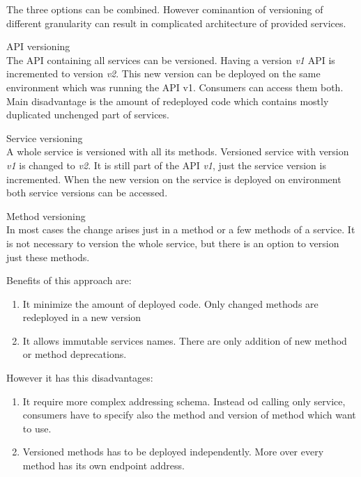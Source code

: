 The three options can be combined. However cominantion of versioning of different granularity can result in complicated architecture of provided services.

\begin{description}
\item{API versioning} \\
The API containing all services can be versioned. Having a version \emph{v1} API is incremented to version \emph{v2}. This new version can be deployed on the same environment which was running the API v1. Consumers can access them both. Main disadvantage is the amount of redeployed code which contains mostly duplicated unchenged part of services. 
\item{Service versioning} \\
  A whole service is versioned with all its methods. Versioned service with version \emph{v1} is changed to \emph{v2}. It is still part of the API \emph{v1}, just the service version is incremented. When the new version on the service is deployed on environment both service versions can be accessed. 
\item{Method versioning} \\
  In most cases the change arises just in a method or a few methods of a service. It is not necessary to version the whole service, but there is an option to version just these methods. 
  
  Benefits of this approach are:
  
  \begin{enumerate}
    \item It minimize the amount of deployed code. Only changed methods are redeployed in a new version
    \item It allows immutable services names. There are only addition of new method or method deprecations.
  \end{enumerate}
  
  However it has this disadvantages:
  
  \begin{enumerate}
    \item It require more complex addressing schema. Instead od calling only service, consumers have to specify also the method and version of method which want to use.
    \item Versioned methods has to be deployed independently. More over every method has its own endpoint address.
  \end{enumerate}
\end{description}

